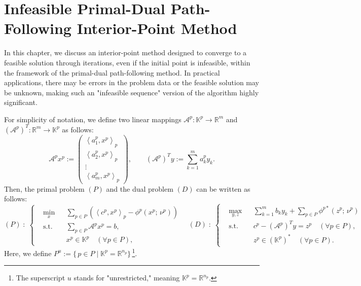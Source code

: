 \section{Infeasible Primal-Dual Path-Following Interior-Point Method}
\label{sec:infeasible_IPM}

In this chapter, we discuss an interior-point method designed to converge to a feasible solution through iterations, even if the initial point is infeasible, within the framework of the primal-dual path-following method.
In practical applications, there may be errors in the problem data or the feasible solution may be unknown, making such an "infeasible sequence" version of the algorithm highly significant.

\medskip

\noindent
For simplicity of notation, we define two linear mappings 
$\mathcal{A}^p : \mathbb{K}^p \to \mathbb{R}^m$ and 
$(\mathcal{A}^p)^T : \mathbb{R}^m \to \mathbb{K}^p$ 
as follows:
\[
  \mathcal{A}^p x^p
  := 
  \begin{pmatrix}
      \left\langle a^p_1, x^p \right\rangle_p \\
      \left\langle a^p_2, x^p \right\rangle_p \\
      \vdots \\
      \left\langle a^p_m, x^p \right\rangle_p
  \end{pmatrix},
  \qquad
  (\mathcal{A}^p)^T y
  :=
  \sum_{k=1}^m a^p_k y_k.
\]
Then, the primal problem $(P)$ and the dual problem $(D)$ can be written as follows:
\[
  (P)\;:\;
  \left\{
  \begin{aligned}
      &\min_{x}
       && \sum_{p \in P} \left( \left\langle c^p, x^p \right\rangle_p - \phi^p(x^p;\, \nu^p) \right) \\
      &\text{s.t.}
       && \sum_{p \in P} \mathcal{A}^p x^p = b,\\
      & && x^p \in \mathbb{K}^p \quad (\forall p \in P),
  \end{aligned}
  \right.
  \quad
  (D)\;:\;
  \left\{
  \begin{aligned}
      &\max_{y,z}
       && \sum_{k=1}^m b_k y_k 
          + \sum_{p \in P} \phi^{p*}(z^p;\, \nu^p) \\
      &\text{s.t.}
       && c^p - (\mathcal{A}^p)^T y = z^p \quad (\forall p \in P),\\
      & && z^p \in (\mathbb{K}^p)^* \quad (\forall p \in P).
  \end{aligned}
  \right.
\]
Here, we define $P^u := \{\, p \in P \mid \mathbb{K}^p = \mathbb{R}^{n_p} \}\,$\footnote{%
  The superscript $u$ stands for "unrestricted," meaning $\mathbb{K}^p = \mathbb{R}^{n_p}$.
}.

